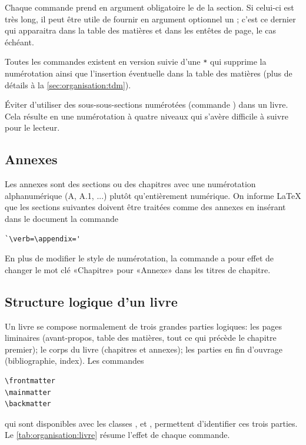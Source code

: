 Chaque commande prend en argument obligatoire le  de la
section. Si celui-ci est très long, il peut être utile de fournir en
argument optionnel un ; c'est ce dernier qui
apparaitra dans la table des matières et dans les entêtes de page, le cas
échéant.

Toutes les commandes existent en version suivie d'une \verb=*= qui
supprime la numérotation ainsi que l'insertion éventuelle dans la
table des matières (plus de détails à la \autoref{sec:organisation:tdm}).

\begin{conseil}
  Éviter d'utiliser des sous-sous-sections numérotées (commande
  \cmdprint{\subsubsection}) dans un livre. Cela résulte en une
  numérotation à quatre niveaux qui s'avère difficile à suivre pour le
  lecteur.
\end{conseil}

\subsection{Annexes}
\label{sec:organisation:parties:annexes}

Les annexes sont des sections ou des chapitres avec une numérotation
alphanumérique (A, A.1, ...) plutôt qu'entièrement numérique. On
informe {\LaTeX} que les sections suivantes doivent être traitées
comme des annexes en insérant dans le document la commande
\begin{lstlisting}
`\verb=\appendix='
\end{lstlisting}
En plus de modifier le style de numérotation, la commande a pour effet
de changer le mot clé «Chapitre» pour «Annexe» dans les titres de
chapitre.

\subsection{Structure logique d'un livre}
\label{sec:oganisation:parties:livre}

Un livre se compose normalement de trois grandes parties logiques: les
pages liminaires (avant-propos, table des matières, tout ce qui
précède le chapitre premier); le corps du livre (chapitres et
annexes); les parties en fin d'ouvrage (bibliographie, index). Les
commandes
\begin{lstlisting}
\frontmatter
\mainmatter
\backmatter
\end{lstlisting}
qui sont disponibles avec les classes ,  et
, permettent d'identifier ces trois parties. Le
\autoref{tab:organisation:livre} résume l'effet de chaque commande.

